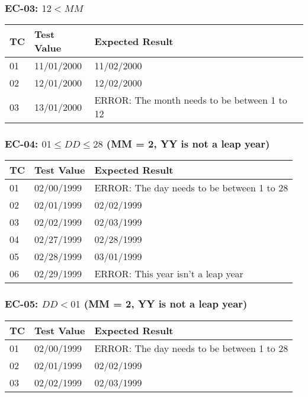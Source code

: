 \documentclass[11pt, oneside]{article}   	%
\begin{document}
\subsubsection{EC-03: $12 < MM$}
\begin{table}[H]
\begin{tabular}{|l|l|l|}
\hline
TC & Test Value & Expected Result                              \\ \hline
01 & 11/01/2000 & 11/02/2000                                   \\ \hline
02 & 12/01/2000 & 12/02/2000                                   \\ \hline
03 & 13/01/2000 & ERROR: The month needs to be between 1 to 12 \\ \hline
\end{tabular}
\end{table}

\subsubsection{EC-04: $01 \leq DD \leq 28$ (MM = 2, YY is not a leap year)}
\begin{table}[H]
\begin{tabular}{|l|l|l|}
\hline
TC & Test Value & Expected Result                            \\ \hline
01 & 02/00/1999 & ERROR: The day needs to be between 1 to 28 \\ \hline
02 & 02/01/1999 & 02/02/1999                                 \\ \hline
03 & 02/02/1999 & 02/03/1999                                 \\ \hline
04 & 02/27/1999 & 02/28/1999                                 \\ \hline
05 & 02/28/1999 & 03/01/1999                                 \\ \hline
06 & 02/29/1999 & ERROR: This year isn't a leap year         \\ \hline
\end{tabular}
\end{table}

\subsubsection{EC-05: $DD < 01$ (MM = 2, YY is not a leap year)}
\begin{table}[H]
\begin{tabular}{|l|l|l|}
\hline
TC & Test Value & Expected Result                            \\ \hline
01 & 02/00/1999 & ERROR: The day needs to be between 1 to 28 \\ \hline
02 & 02/01/1999 & 02/02/1999                                 \\ \hline
03 & 02/02/1999 & 02/03/1999                                 \\ \hline
\end{tabular}
\end{table}
\end{document}
